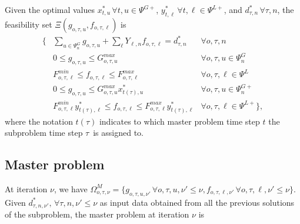 Given the optimal values $x_{t, u}^* \, \forall t, u \in \Psi^{G+}$, $y_{t, \ell}^* \, \forall t, \ell \in \Psi^{L+}$, and $d_{\tau, n}^* \, \forall \tau, n$, the feasibility set $\Xi(g_{o, \tau, u}, f_{o, \tau, \ell})$ is
\begin{align}
\{ &\sum\limits_{u \in \Psi^G_{n}} g_{o, \tau, u} + \sum\limits_{\ell} Y_{\ell, n} f_{o, \tau, \ell} = d_{\tau, n}^* & \forall o, \tau, n\\
&0 \leq g_{o, \tau, u} \leq G_{o, \tau, u}^{max} & \forall o, \tau, u \in \Psi_n^G\\
&F_{o, \tau, \ell}^{min} \leq f_{o, \tau, \ell} \leq F_{o, \tau, \ell}^{max} & \forall o, \tau, \ell \in \Psi^L \\
&0 \leq g_{o, \tau, u} \leq G_{o, \tau, u}^{max} x_{t(\tau), u}^* & \forall o, \tau, u \in \Psi_n^{G+} \\
&F_{o, \tau, \ell}^{min} y_{t(\tau), \ell}^* \leq f_{o, \tau, \ell} \leq F_{o, \tau, \ell}^{max} y_{t(\tau), \ell}^* & \forall o, \tau, \ell \in \Psi^{L+} \},
\end{align}
where the notation $t(\tau)$ indicates to which master problem time step $t$ the subproblem time step $\tau$ is assigned to.

\subsection{Master problem}

At iteration $\nu$, we have $\Omega_{o, \tau, \nu}^{M} = \{ g_{o, \tau, u, \nu'} \, \forall o, \tau, u, \nu' \leq \nu, f_{o, \tau, \ell, \nu'} \, \forall o, \tau, \ell, \nu' \leq \nu \}$. Given $d_{\tau, n, \nu'}^*, \, \forall \tau, n, \nu' \leq \nu$ as input data obtained from all the previous solutions of the subproblem, the master problem at iteration $\nu$ is

